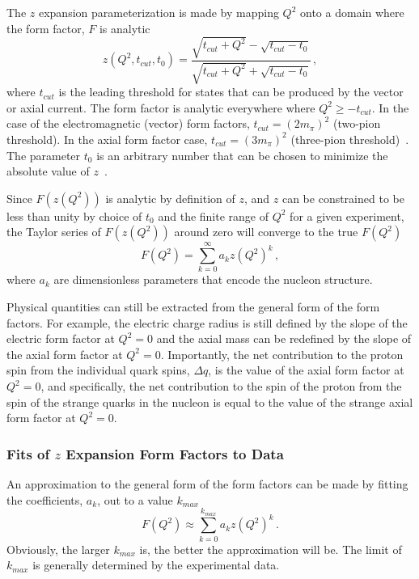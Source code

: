   The $z$ expansion parameterization is made by mapping $Q^2$ onto a domain
  where the form factor, $F$ is analytic
  \begin{equation}\label{eq:zdef}
    z(Q^2,t_{cut},t_0) = 
    \frac{\sqrt{t_{cut}+Q^2} - \sqrt{t_{cut} - t_0}}{\sqrt{t_{cut}+Q^2} + \sqrt{t_{cut} - t_0}} \,,
  \end{equation}
  where $t_{cut}$ is the leading threshold for states that can be produced by
  the vector or axial current. The form factor is analytic everywhere where
  $Q^2 \ge -t_{cut}$.  In the case of the electromagnetic (vector) form factors,
  $t_{cut} = (2m_{\pi})^2$ (two-pion threshold). In the axial form factor case,
  $t_{cut} = (3m_{\pi})^2$ (three-pion threshold)~\cite{Federbush:1958zz}. The
  parameter $t_0$ is an arbitrary number that can be chosen to minimize the
  absolute value of $z$~\cite{Meyer:2016oeg}.

  Since $F(z(Q^2))$ is analytic by definition of $z$, and $z$ can be
  constrained to be less than unity by choice of $t_0$ and the finite range of
  $Q^2$ for a given experiment, the Taylor series of $F(z(Q^2))$ around zero
  will converge to the true $F(Q^2)$
  \begin{equation}
    F(Q^2) = \sum_{k=0}^{\infty}a_{k}z(Q^2)^k \,,
  \end{equation}
  where $a_k$ are dimensionless parameters that encode the nucleon structure.

  Physical quantities can still be extracted from the general form of the form
  factors. For example, the electric charge radius is still defined by the
  slope of the electric form factor at $Q^2 = 0$ and the axial mass can be
  redefined by the slope of the axial form factor at $Q^2 = 0$.  Importantly,
  the net contribution to the proton spin from the individual quark spins,
  $\Delta q$, is the value of the axial form factor at $Q^2 = 0$, and
  specifically, the net contribution to the spin of the proton from the spin of
  the strange quarks in the nucleon is equal to the value of the strange axial
  form factor at $Q^2 = 0$.

  \subsubsection{Fits of $z$ Expansion Form Factors to Data}

  An approximation to the general form of the form factors can be made by
  fitting the coefficients, $a_k$, out to a value $k_{max}$
  \begin{equation}
    F(Q^2) \approx \sum_{k=0}^{k_{max}} a_{k}z(Q^2)^k \,.
  \end{equation}
  Obviously, the larger $k_{max}$ is, the better the approximation will be. The
  limit of $k_{max}$ is generally determined by the experimental data.

